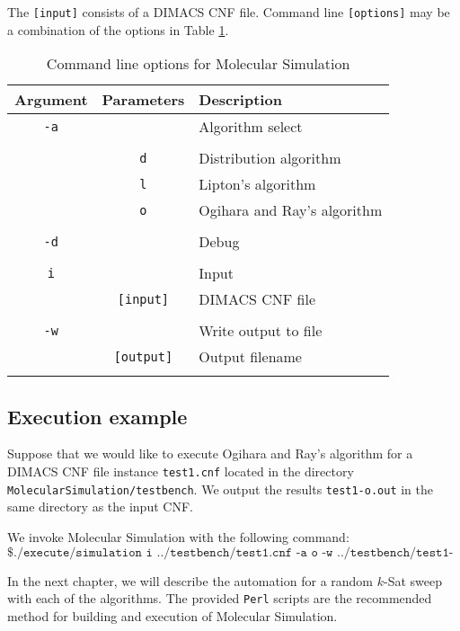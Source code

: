 The \texttt{[input]} consists of a DIMACS CNF file.  Command line \texttt{[options]} may be a combination of the options in Table \ref{MolecularCommandLineArgs}.

\begin{table}[htdp]
\caption{Command line options for Molecular Simulation}
\begin{center}
\begin{tabular}{|c|c|l|}
\hline
\textbf{Argument} & \textbf{Parameters} & \textbf{Description} \\ \hline
 \texttt{-a}	& 				   & Algorithm select \\
  				&				   &		 \\
 				& \texttt{d}	   & Distribution algorithm		 \\
 				& \texttt{l}	   & Lipton's algorithm		 \\
 				& \texttt{o}	   & Ogihara and Ray's algorithm		 \\
 				&				   &		 \\ \hline 				
\texttt{-d}		&				   & Debug		 \\ 				
 				&				   &		 \\ \hline
\texttt{i}		&				   & Input		 \\ 				
				& \texttt{[input]} & DIMACS CNF file		 \\ 				
 				&				   &		 \\ \hline 				
\texttt{-w}		&				   & Write output to file		 \\
 				& \texttt{[output]} & Output filename \\
 				&				   &		 \\ \hline 				
\end{tabular}
\end{center}
\label{MolecularCommandLineArgs}
\end{table}%

\FloatBarrier

\subsection{Execution example}

Suppose that we would like to execute Ogihara and Ray's algorithm for a DIMACS CNF file instance \texttt{test1.cnf} located in the directory \texttt{MolecularSimulation/testbench}.  We output the results \texttt{test1-o.out} in the same directory as the input CNF.

We invoke Molecular Simulation with the following command:
\[
\texttt{\$ ./execute/simulation i ../testbench/test1.cnf -a o -w ../testbench/test1-o.out}
\]
		
In the next chapter, we will describe the automation for a random $k$-{\sc Sat} sweep with each of the algorithms.  The provided \texttt{Perl} scripts are the recommended method for building and execution of Molecular Simulation.
